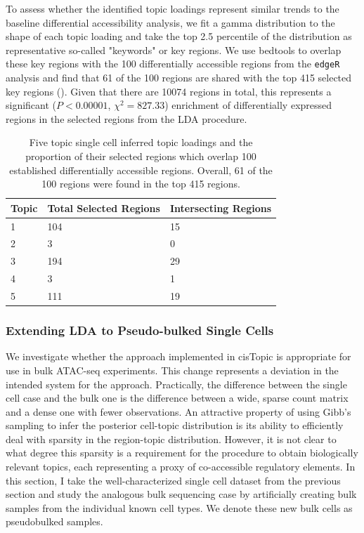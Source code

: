 To assess whether the identified topic loadings represent similar trends to the baseline differential accessibility analysis, we fit a gamma distribution to the shape of each topic loading and take the top 2.5 percentile of the distribution as representative so-called "keywords" or key regions. We use bedtools to overlap these key regions with the 100 differentially accessible regions from the {\tt edgeR} analysis and find that 61 of the 100 regions are shared with the top 415 selected key regions (). Given that there are 10074 regions in total, this represents a significant ($P<0.00001$, $\chi^2 = 827.33$) enrichment of differentially expressed regions in the selected regions from the LDA procedure.


\begin{table}
  \centering
  \begin{tabular}{l|l|l}
  Topic & Total Selected Regions & Intersecting Regions  \\ 
  \hline
  1     & 104                    & 15                    \\
  2     & 3                      & 0                     \\
  3     & 194                    & 29                    \\
  4     & 3                      & 1                     \\
  5     & 111                    & 19                   
  \end{tabular}
  \caption{Five topic single cell inferred topic loadings and the proportion of their selected regions which overlap 100 established differentially accessible regions. Overall, 61 of the 100 regions were found in the top 415 regions.}
  \label{table:sc_t5_over}
  \end{table}

\subsubsection{Extending LDA to Pseudo-bulked Single Cells}

We investigate whether the approach implemented in cisTopic is appropriate for use in bulk ATAC-seq experiments. This change represents a deviation in the intended system for the approach. Practically, the difference between the single cell case and the bulk one is the difference between a wide, sparse count matrix and a dense one with fewer observations. An attractive property of using Gibb's sampling to infer the posterior cell-topic distribution is its ability to efficiently deal with sparsity in the region-topic distribution. However, it is not clear to what degree this sparsity is a requirement for the procedure to obtain biologically relevant topics, each representing a proxy of co-accessible regulatory elements. In this section, I take the well-characterized single cell dataset from the previous section and study the analogous bulk sequencing case by artificially creating bulk samples from the individual known cell types. We denote these new bulk cells as pseudobulked samples.

